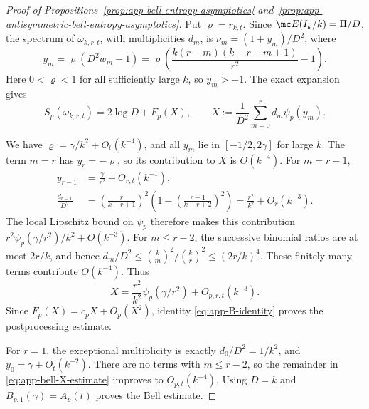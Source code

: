 \begin{proof}[Proof of Propositions~\ref{prop:app-bell-entropy-asymptotics}
and~\ref{prop:app-antisymmetric-bell-entropy-asymptotics}]
Put \(\varrho=r_{k,t}\). Since \(\mc E(I_k/k)=\Pi/D\), the
spectrum of \(\omega_{k,r,t}\), with multiplicities \(d_m\), is
\(\nu_m=(1+y_m)/D^2\), where
\begin{equation}
    y_m=\varrho(D^2w_m-1)
       =\varrho\left(\frac{k(r-m)(k-r-m+1)}{r^2}-1\right).
\end{equation}
Here \(0<\varrho<1\) for all sufficiently large \(k\), so \(y_m>-1\).
The exact expansion gives
\begin{equation}
    S_p(\omega_{k,r,t})=2\log D+F_p(X),\qquad
    X:=\frac1{D^2}\sum_{m=0}^rd_m\psi_p(y_m).
    \label{eq:app-bell-X}
\end{equation}

We have \(\varrho=\gamma/k^2+O_t(k^{-4})\), and all \(y_m\) lie in
\([-1/2,2\gamma]\) for large \(k\). The term \(m=r\) has
\(y_r=-\varrho\), so its contribution to \(X\) is \(O(k^{-4})\).
For \(m=r-1\),
\begin{align}
    y_{r-1}&=\frac\gamma{r^2}+O_{r,t}(k^{-1}),\\
    \frac{d_{r-1}}{D^2}
    &=\left(\frac r{k-r+1}\right)^2
      \left(1-\left(\frac{r-1}{k-r+2}\right)^2\right)
      =\frac{r^2}{k^2}+O_r(k^{-3}).
\end{align}
The local Lipschitz bound on \(\psi_p\) therefore makes this
contribution \(r^2\psi_p(\gamma/r^2)/k^2+O(k^{-3})\).
For \(m\leq r-2\), the successive binomial ratios are at most
\(2r/k\), and hence
\(d_m/D^2\leq\binom km^2/\binom kr^2\leq(2r/k)^4\).
These finitely many terms contribute \(O(k^{-4})\). Thus
\begin{equation}
    X=\frac{r^2}{k^2}\psi_p(\gamma/r^2)+O_{p,r,t}(k^{-3}).
    \label{eq:app-bell-X-estimate}
\end{equation}
Since \(F_p(X)=c_pX+O_p(X^2)\), identity
\eqref{eq:app-B-identity} proves the postprocessing estimate.

For \(r=1\), the exceptional multiplicity is exactly
\(d_0/D^2=1/k^2\), and \(y_0=\gamma+O_t(k^{-2})\).
There are no terms with \(m\leq r-2\), so the remainder in
\eqref{eq:app-bell-X-estimate} improves to \(O_{p,t}(k^{-4})\).
Using \(D=k\) and \(B_{p,1}(\gamma)=A_p(t)\) proves the Bell estimate.
\end{proof}

